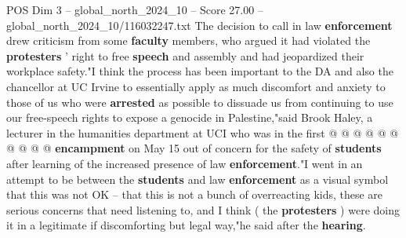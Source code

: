 \begin{textsample}{POS Dim 3 – global\_north\_2024\_10 – Score 27.00 – global\_north\_2024\_10/116032247.txt}
The decision to call in law \textbf{enforcement} drew criticism from some \textbf{faculty} members, who argued it had violated the \textbf{protesters} ' right to free \textbf{speech} and assembly and had jeopardized their workplace safety."I think the process has been important to the DA and also the chancellor at UC Irvine to essentially apply as much discomfort and anxiety to those of us who were \textbf{arrested} as possible to dissuade us from continuing to use our free-speech rights to expose a genocide in Palestine,"said Brook Haley, a lecturer in the humanities department at UCI who was in the first @ @ @ @ @ @ @ @ @ @ \textbf{encampment} on May 15 out of concern for the safety of \textbf{students} after learning of the increased presence of law \textbf{enforcement}."I went in an attempt to be between the \textbf{students} and law \textbf{enforcement} as a visual symbol that this was not OK -- that this is not a bunch of overreacting kids, these are serious concerns that need listening to, and I think ( the \textbf{protesters} ) were doing it in a legitimate if discomforting but legal way,"he said after the \textbf{hearing}.

\end{textsample}
